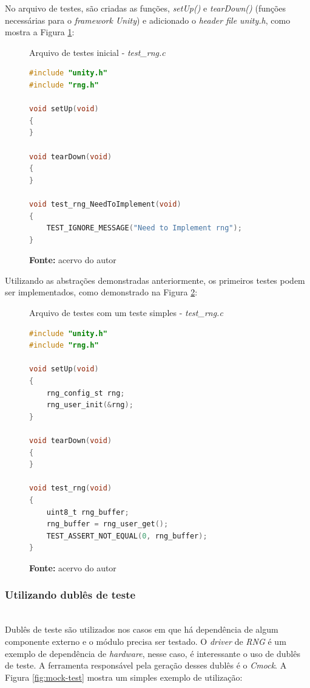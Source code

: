 \documentclass[times, twoside, watermark]{artigo}
\begin{document}
No arquivo de testes, são criadas as funções, \textit{setUp()} e
\textit{tearDown()} (funções necessárias para o \textit{framework Unity}) 
e adicionado o \textit{header file unity.h}, como 
mostra a Figura \ref{fig:tests-init}:\hfill\

\begin{figure}[H]
  \centering
  \caption{Arquivo de testes inicial - \textit{test\_rng.c}}
\begin{lstlisting}[language=C]
#include "unity.h"
#include "rng.h"

void setUp(void)
{
}

void tearDown(void)
{
}

void test_rng_NeedToImplement(void)
{
	TEST_IGNORE_MESSAGE("Need to Implement rng");
}
\end{lstlisting}
  \label{fig:tests-init}
  \caption*{\newline\textbf{Fonte:} acervo do autor}
\end{figure}

Utilizando as abstrações demonstradas anteriormente, os primeiros testes podem ser
implementados, como demonstrado na Figura \ref{fig:simple-test}:\hfill\\

\begin{figure}[H]
  \centering
  \caption{Arquivo de testes com um teste simples  - \textit{test\_rng.c}}
\begin{lstlisting}[language=C]
#include "unity.h"
#include "rng.h"

void setUp(void)
{
	rng_config_st rng;
	rng_user_init(&rng);	
}

void tearDown(void)
{
}

void test_rng(void)
{	
	uint8_t rng_buffer;
	rng_buffer = rng_user_get();
	TEST_ASSERT_NOT_EQUAL(0, rng_buffer);
}
\end{lstlisting}
  \label{fig:simple-test}
  \caption*{\newline\textbf{Fonte:} acervo do autor}
\end{figure}

\subsubsection{Utilizando dublês de teste}\hfill\\

Dublês de teste são utilizados nos casos em que há dependência de algum componente
externo e o módulo precisa ser testado. O \textit{driver} de \textit{RNG} é um
exemplo de dependência de \textit{hardware}, nesse caso, é interessante o uso
de dublês de teste. A ferramenta responsável pela geração desses dublês é o
\textit{Cmock}. A Figura \ref{fig:mock-test} mostra um simples exemplo de utilização:
\hfill\\
\end{document}
